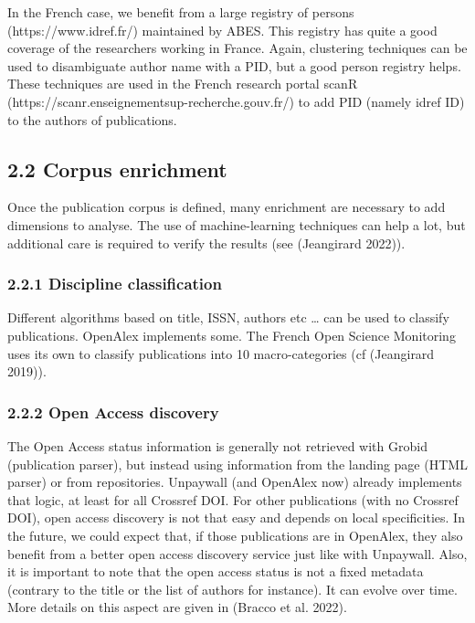 \documentclass[
]{article}
\begin{document}
In the French case, we benefit from a large registry of persons
(https://www.idref.fr/) maintained by ABES. This registry has quite a
good coverage of the researchers working in France. Again, clustering
techniques can be used to disambiguate author name with a PID, but a
good person registry helps. These techniques are used in the French
research portal scanR (https://scanr.enseignementsup-recherche.gouv.fr/)
to add PID (namely idref ID) to the authors of publications.

\hypertarget{corpus-enrichment}{%
\subsection{2.2 Corpus enrichment}\label{corpus-enrichment}}

Once the publication corpus is defined, many enrichment are necessary to
add dimensions to analyse. The use of machine-learning techniques can
help a lot, but additional care is required to verify the results (see
(Jeangirard 2022)).

\hypertarget{discipline-classification}{%
\subsubsection{2.2.1 Discipline
classification}\label{discipline-classification}}

Different algorithms based on title, ISSN, authors etc \ldots{} can be
used to classify publications. OpenAlex implements some. The French Open
Science Monitoring uses its own to classify publications into 10
macro-categories (cf (Jeangirard 2019)).

\hypertarget{open-access-discovery}{%
\subsubsection{2.2.2 Open Access
discovery}\label{open-access-discovery}}

The Open Access status information is generally not retrieved with
Grobid (publication parser), but instead using information from the
landing page (HTML parser) or from repositories. Unpaywall (and OpenAlex
now) already implements that logic, at least for all Crossref DOI. For
other publications (with no Crossref DOI), open access discovery is not
that easy and depends on local specificities. In the future, we could
expect that, if those publications are in OpenAlex, they also benefit
from a better open access discovery service just like with Unpaywall.
Also, it is important to note that the open access status is not a fixed
metadata (contrary to the title or the list of authors for instance). It
can evolve over time. More details on this aspect are given in (Bracco
et al. 2022).
\end{document}
